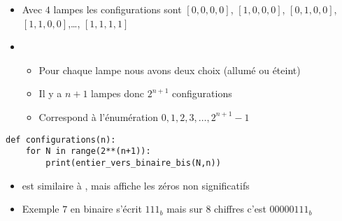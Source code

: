\begin{frame}[fragile]

\begin{itemize}
  \item Avec $4$ lampes les configurations sont $[0,0,0,0]$, $[1,0,0,0]$, $[0,1,0,0]$, $[1,1,0,0]$,\ldots, $[1,1,1,1]$

\pause

  \item 
  \begin{itemize}
    \item Pour chaque lampe nous avons deux choix (allumé ou éteint)

\pause

    \item Il y a $n+1$ lampes donc $2^{n+1}$ configurations

\pause

    \item Correspond à l'énumération $0,1,2,3,\ldots, 2^{n+1}-1$
  \end{itemize}
\end{itemize}

\pause

\begin{algo}[binaire.py (3)]
\begin{lstlisting}
def configurations(n):
    for N in range(2**(n+1)):
        print(entier_vers_binaire_bis(N,n))
\end{lstlisting}  
\end{algo}

\pause

\begin{itemize}
  \item {} est similaire à ,
mais affiche les zéros non significatifs

\pause

  \item Exemple $7$ en binaire s'écrit $111_b$ mais sur $8$ chiffres c'est $00000111_b$
\end{itemize}
\end{frame}



